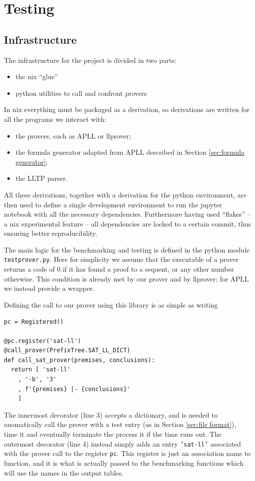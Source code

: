\chapter{Testing}
\section{Infrastructure}
The infrastructure for the project is divided in two parts:
\begin{itemize}
	\item the nix ``glue''
	\item python utilities to call and confront provers
\end{itemize}
In nix everything must be packaged as a derivation, so derivations are written for all the programs we interact with:
\begin{itemize}
	\item the provers, such as APLL or llprover;
	\item the formula generator adapted from APLL described in Section \ref{sec:formula generator};
	\item the LLTP parser.
\end{itemize}
All these derivations, together with a derivation for the python environment, are then used to define a single development environment to run the jupyter notebook with all the necessary dependencies.
Furthermore having used ``flakes'' -- a nix experimental feature -- all dependencies are locked to a certain commit, thus ensuring better reproducibility.

The main logic for the benchmarking and testing is defined in the python module \texttt{testprover.py}.
Here for simplicity we assume that the executable of a prover returns a code of 0 if it has found a proof to a sequent, or any other number otherwise.
This condition is already met by our prover and by llprover; for APLL we instead provide a wrapper.

Defining the call to our prover using this library is as simple as writing
\begin{verbatim}
pc = Registered()

@pc.register('sat-ll')
@call_prover(PrefixTree.SAT_LL_DICT)
def call_sat_prover(premises, conclusions):
  return [ 'sat-ll'
    , '-b', '3'
    , f'{premises} |- {conclusions}'
    ]
\end{verbatim}
The innermost decorator (line 3) accepts a dictionary, and is needed to auomatically call the prover with a test entry (as in Section \ref{sec:file format}), time it and eventually terminate the process it if the time runs out.
The outermost decorator (line 4) instead simply adds an entry \texttt{'sat-ll'} associated with the prover call to the register \texttt{pc}.
This register is just an association name to function, and it is what is actually passed to the benchmarking functions which will use the names in the output tables.

